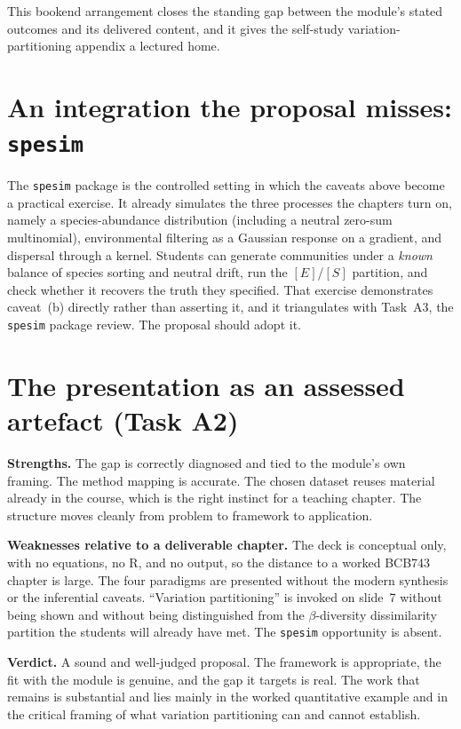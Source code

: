 \documentclass[11pt,a4paper]{article}
\newcommand{\fname}[1]{\texttt{\small #1}}
\begin{document}
This bookend arrangement closes the standing gap between the module's stated outcomes and
its delivered content, and it gives the self-study variation-partitioning appendix a
lectured home.

\section{An integration the proposal misses: \fname{spesim}}

The \fname{spesim} package is the controlled setting in which the caveats above become a
practical exercise. It already simulates the three processes the chapters turn on, namely a
species-abundance distribution (including a neutral zero-sum multinomial), environmental
filtering as a Gaussian response on a gradient, and dispersal through a kernel. Students
can generate communities under a \emph{known} balance of species sorting and neutral
drift, run the $[E]$/$[S]$ partition, and check whether it recovers the truth they
specified. That exercise demonstrates caveat~(b) directly rather than asserting it, and it
triangulates with Task~A3, the \fname{spesim} package review. The proposal should adopt it.

\section{The presentation as an assessed artefact (Task A2)}

\textbf{Strengths.} The gap is correctly diagnosed and tied to the module's own framing.
The method mapping is accurate. The chosen dataset reuses material already in the course,
which is the right instinct for a teaching chapter. The structure moves cleanly from
problem to framework to application.

\textbf{Weaknesses relative to a deliverable chapter.} The deck is conceptual only, with no
equations, no R, and no output, so the distance to a worked BCB743 chapter is large. The
four paradigms are presented without the modern synthesis or the inferential caveats.
``Variation partitioning'' is invoked on slide~7 without being shown and without being
distinguished from the $\beta$-diversity dissimilarity partition the students will already
have met. The \fname{spesim} opportunity is absent.

\textbf{Verdict.} A sound and well-judged proposal. The framework is appropriate, the fit
with the module is genuine, and the gap it targets is real. The work that remains is
substantial and lies mainly in the worked quantitative example and in the critical framing
of what variation partitioning can and cannot establish.
\end{document}
